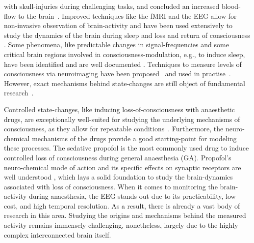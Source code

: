 with skull-injuries during challenging tasks,
and concluded an increased blood-flow to the brain~\cite{mosso_ueber_1881}.
Improved techniques like the fMRI and the EEG allow for non-invasive observation of brain-activity and have been
used extensively to study the dynamics of the brain during sleep and loss and return of consciousness
\citationneeded.
Some phenomena, like predictable changes in signal-frequencies and some critical brain regions involved in
consciousness-modulation, e.g., to induce sleep, have been identified and are well documented
\citationneeded.
Techniques to measure levels of consciousness via neuroimaging have been proposed~\cite{sigl_introduction_1994,
    casali_theoretically_2013} and used in practise~\cite{mathur_bispectral_2022}.
However, exact mechanisms behind state-changes are still object of fundamental research~\cite{tantirigama_perspective_2020}.

Controlled state-changes, like inducing loss-of-consciousness with anaesthetic drugs,
are exceptionally well-suited for studying the underlying mechanisms of consciousness,
as they allow for repeatable conditions~\cite{bonhomme_general_2019}.
Furthermore, the neuro-chemical mechanisms of the drugs provide a good starting-point for modeling these processes.
The sedative propofol is the most commonly used drug to induce controlled loss of consciousness
during general anaesthesia (GA)\citationneeded.
Propofol's neuro-chemical mode of action and its specific effects on synaptic receptors are well understood \citationneeded,
which lays a solid foundation to study the brain-dynamics associated with loss of consciousness.
When it comes to monitoring the brain-activity during anaesthesia,
the EEG stands out due to its practicability, low cost, and high temporal resolution.
As a result, there is already a vast body of research in this area.
Studying the origins and mechanisms behind the measured activity remains immensely challenging, nonetheless,
largely due to the highly complex interconnected brain itself. \citationneeded

